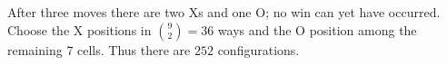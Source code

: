 After three moves there are two Xs and one O; no win can yet have occurred. Choose the X positions in $\binom92=36 $ ways and the O position among the remaining 7 cells. Thus there are $\boxed{252}$ configurations.
